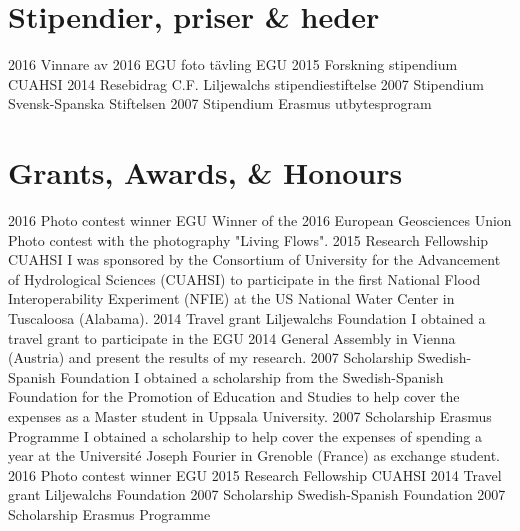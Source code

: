 \ifswedish
    \section{Stipendier, priser \& heder}
    \shortposition
        {2016}
        {Vinnare av 2016 EGU foto tävling}
        {EGU}
    \shortposition
        {2015}
        {Forskning stipendium}
        {CUAHSI}
    \shortposition
        {2014}
        {Resebidrag}
        {C.F. Liljewalchs stipendiestiftelse}
    \shortposition
        {2007}
        {Stipendium}
        {Svensk-Spanska Stiftelsen}
    \shortposition
        {2007}
        {Stipendium}
        {Erasmus utbytesprogram}
\else
    \section{Grants, Awards, \& Honours}
    \ifacademic
    \position
        {2016}
        {Photo contest winner}
        {EGU}
        {Winner of the 2016 European Geosciences Union Photo contest with the photography "Living Flows".}
    \position
        {2015}
        {Research Fellowship}
        {CUAHSI}
        {I was sponsored by the Consortium of University for the Advancement of Hydrological Sciences (CUAHSI) to participate in the first National Flood Interoperability Experiment (NFIE) at the US National Water Center in Tuscaloosa (Alabama).}
    \position
        {2014}
        {Travel grant}
        {Liljewalchs Foundation}
        {I obtained a travel grant to participate in the EGU 2014 General Assembly in Vienna (Austria) and present the results of my research.}
    \position
        {2007}
        {Scholarship}
        {Swedish-Spanish Foundation}
        {I obtained a scholarship from the Swedish-Spanish Foundation for the Promotion of Education and Studies to help cover the expenses as a Master student in Uppsala University.}
    \position
        {2007}
        {Scholarship}
        {Erasmus Programme}
        {I obtained a scholarship to help cover the expenses of spending a year at the Université Joseph Fourier in Grenoble (France) as exchange student.}
    \else
    \shortposition
        {2016}
        {Photo contest winner}
        {EGU}
    \shortposition
        {2015}
        {Research Fellowship}
        {CUAHSI}
    \shortposition
        {2014}
        {Travel grant}
        {Liljewalchs Foundation}
    \shortposition
        {2007}
        {Scholarship}
        {Swedish-Spanish Foundation}
    \shortposition
        {2007}
        {Scholarship}
        {Erasmus Programme}
    \fi
\fi
